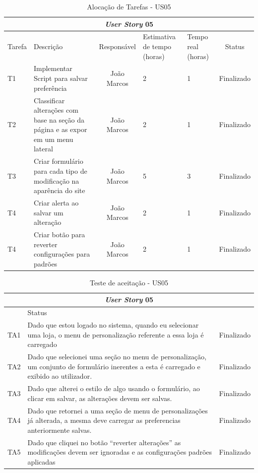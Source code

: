 \documentclass[a4paper,12pt]{monografia}
\begin{document}
\begin{longtable}{|p{1.5cm}|p{3.5cm}|c|p{2cm}|p{2cm}|c|}
\caption{Alocação de Tarefas - US05}
\label{quadro:tat-us05}
\hline
\multicolumn{6}{|c|}{\textbf{\textit{User Story} 05}}\\
\hline		
\rowcolor{ballblue}
Tarefa & Descrição & Responsável & Estimativa de tempo (horas) & Tempo real (horas) & Status\\
\hline
T1 & Implementar Script para salvar preferência & João Marcos & 2 & 1 & Finalizado\\
\hline
T2 & Classificar alterações com base na seção da página e as expor em um menu lateral & João Marcos & 2 & 1 & Finalizado\\
\hline
T3 & Criar formulário para cada tipo de modificação na aparência do site & João Marcos & 5 & 3 & Finalizado\\
\hline
T4 & Criar alerta ao salvar um alteração & João Marcos & 2 & 1 & Finalizado\\
\hline
T4 & Criar botão para reverter configurações para padrões & João Marcos & 2 & 1 & Finalizado\\
\hline
\end{longtable}

\begin{longtable}{|l|p{11.8cm}|c|}
\caption{Teste de aceitação - US05}
\label{quadro:teste-aceitacao-us05}
\hline
\multicolumn{3}{|c|}{\textbf{\textit{User Story} 05}}\\
\hline		
\rowcolor{ballblue}
\multicolumn{2}{|c|}{Testes de aceitação} & Status\\	
\hline
TA1 & Dado que estou logado no sistema, quando eu selecionar uma loja, o menu de personalização referente a essa loja é carregado  & Finalizado\\
\hline
TA2 & Dado que selecionei uma seção no menu de personalização, um conjunto de formulário inerentes a esta é carregado e exibido ao utilizador.   & Finalizado\\
\hline
TA3 & Dado que alterei o estilo de algo usando o formulário, ao clicar em salvar, as alterações devem ser salvas.   & Finalizado\\
\hline
TA4 & Dado que retornei a uma seção de menu de personalizações já alterada, a mesma deve carregar as preferencias anteriormente salvas.  & Finalizado\\
\hline
TA5 & Dado que cliquei no botão ``reverter alterações'' as modificações devem ser ignoradas e as configurações padrões aplicadas  & Finalizado\\
\hline
\end{longtable}
\end{document}
